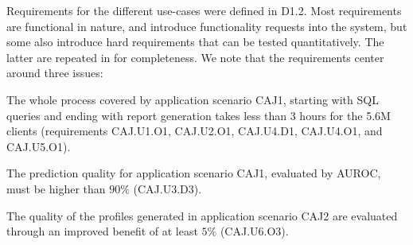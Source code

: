 \documentclass{article}
\theoremstyle{theorem}
\theoremstyle{definition}
\begin{document}
Requirements for the different use-cases were defined in D1.2. Most requirements are functional in nature, and introduce functionality requests into the system, but some also introduce hard requirements that can be tested quantitatively. The latter are repeated in  for completeness. We note that the requirements center around three issues:
\ben
\item The whole process covered by application scenario CAJ1, starting with SQL queries and ending with report generation takes less than 3 hours for the 5.6M clients (requirements CAJ.U1.O1, CAJ.U2.O1, CAJ.U4.D1, CAJ.U4.O1, and CAJ.U5.O1).
\item The prediction quality for application scenario CAJ1, evaluated by AUROC, must be higher than $90\%$ (CAJ.U3.D3).
\item The quality of the profiles generated in application scenario CAJ2 are evaluated through an improved benefit of at least $5\%$ (CAJ.U6.O3).
\een

\begin{table}
\caption{Testable requirements for the Cajamar use-case. }\label{tab:cajamar:requirements}
\end{table}
\end{document}
